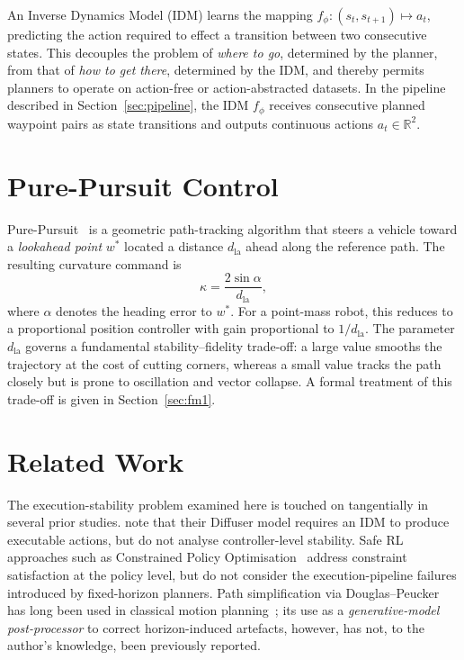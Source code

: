 \documentclass[12pt, a4paper, oneside]{report}
\theoremstyle{definition}
\newcommand{\dlookahead}{d_{\mathrm{la}}}
\newcommand{\R}{\mathbb{R}}
\begin{document}
An Inverse Dynamics Model (IDM) learns the mapping
$f_\phi: (s_t, s_{t+1}) \mapsto a_t$, predicting the action
required to effect a transition between two consecutive states.
This decouples the problem of \emph{where to go}, determined by
the planner, from that of \emph{how to get there}, determined by
the IDM, and thereby permits planners to operate on action-free or
action-abstracted datasets. In the pipeline described in
Section~\ref{sec:pipeline}, the IDM $f_\phi$ receives consecutive
planned waypoint pairs as state transitions and outputs continuous
actions $a_t \in \R^2$.

\section{Pure-Pursuit Control}
\label{sec:bg_purepursuit}

Pure-Pursuit~\citep{coulter1992implementation} is a geometric
path-tracking algorithm that steers a vehicle toward a
\emph{lookahead point} $w^*$ located a distance $\dlookahead$ ahead
along the reference path. The resulting curvature command is
\begin{equation}
  \kappa = \frac{2\sin\alpha}{\dlookahead},
  \label{eq:purepursuit}
\end{equation}
where $\alpha$ denotes the heading error to $w^*$. For a point-mass
robot, this reduces to a proportional position controller with gain
proportional to $1/\dlookahead$. The parameter $\dlookahead$
governs a fundamental stability--fidelity trade-off: a large value
smooths the trajectory at the cost of cutting corners, whereas a
small value tracks the path closely but is prone to oscillation and
vector collapse. A formal treatment of this trade-off is given in
Section~\ref{sec:fm1}.

\section{Related Work}
\label{sec:related}

The execution-stability problem examined here is touched on
tangentially in several prior studies. \citet{janner2022diffuser}
note that their Diffuser model requires an IDM to produce executable
actions, but do not analyse controller-level stability. Safe RL
approaches such as Constrained Policy
Optimisation~\citep{achiam2017constrained} address constraint
satisfaction at the policy level, but do not consider the
execution-pipeline failures introduced by fixed-horizon planners.
Path simplification via Douglas--Peucker has long been used in
classical motion planning~\citep{latombe1991}; its use as a
\emph{generative-model post-processor} to correct horizon-induced
artefacts, however, has not, to the author's knowledge, been
previously reported.
\end{document}
